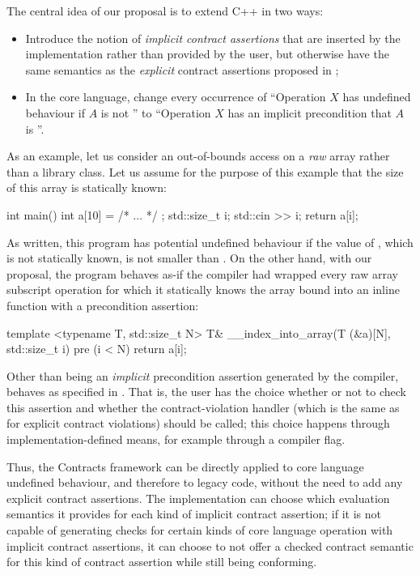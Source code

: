 The central idea of our proposal is to extend C++ in two ways:
\begin{itemize}
\item Introduce the notion of \emph{implicit contract assertions} that are inserted by the implementation rather than provided by the user, but otherwise have the same semantics as the \emph{explicit} contract assertions proposed in \cite{P2900R9};
\item In the core language, change every occurrence of ``Operation $X$ has undefined behaviour if $A$ is not '' to ``Operation $X$ has an implicit precondition that $A$ is ''.
\end{itemize}
As an example, let us consider an out-of-bounds access on a \emph{raw} array rather than a library class. Let us assume for the purpose of this example that the size  of this array is statically known:
\begin{codeblock}
int main() {
  int a[10] = { /* ... */ };
  std::size_t i; std::cin >> i;
  return a[i];
}
\end{codeblock}
As written, this program has potential undefined behaviour if the value of , which is not statically known, is not smaller than . On the other hand, with our proposal, the program behaves as-if the compiler had wrapped every raw array subscript operation for which it statically knows the array bound  into an inline function with a precondition assertion:
\begin{codeblock}
template <typename T, std::size_t N>
T& __index_into_array(T (&a)[N], std::size_t i) 
pre (i < N) {
  return a[i];
}
\end{codeblock}
Other than being an \emph{implicit} precondition assertion generated by the compiler,  behaves as specified in \cite{P2900R9}. That is, the user has the choice whether or not to check this assertion and whether the contract-violation handler (which is the same as for explicit contract violations) should be called; this choice happens through implementation-defined means, for example through a compiler flag. 

Thus, the Contracts framework can be directly applied to core language undefined behaviour, and therefore to legacy code, without the need to add any explicit contract assertions. The implementation can choose which evaluation semantics it provides for each kind of implicit contract assertion; if it is not capable of generating checks for certain kinds of core language operation with implicit contract assertions, it can choose to not offer a checked contract semantic for this kind of contract assertion while still being conforming.

